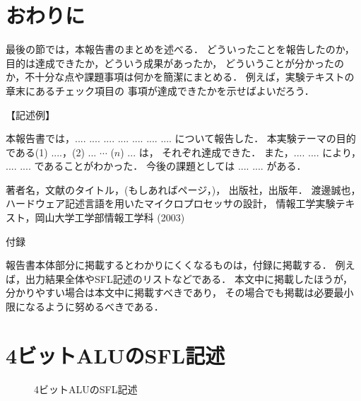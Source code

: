 \documentclass{jarticle}[11pt]
\begin{document}
\section{おわりに}
\label{sec:おわりに}
最後の節では，本報告書のまとめを述べる．
どういったことを報告したのか，目的は達成できたか，どういう成果があったか，
どういうことが分かったのか，不十分な点や課題事項は何かを簡潔にまとめる．
例えば，実験テキスト\cite{bib:実験テキスト}の章末にあるチェック項目の
事項が達成できたかを示せばよいだろう．

\noindent
【記述例】

本報告書では，.... .... .... .... .... .... .... について報告した．
本実験テーマの目的である(1) ....，(2) ... $\cdots$ ($n$) ... は，
それぞれ達成できた．
また，.... .... により， .... .... であることがわかった．
今後の課題としては .... .... がある．

\begin{thebibliography}{99}
 著者名，文献のタイトル，(もしあればページ，)，
出版社，出版年．
渡邊誠也，ハードウェア記述言語を用いたマイクロプロセッサの設計，
情報工学実験テキスト，岡山大学工学部情報工学科 (2003)
\end{thebibliography}


\newpage
\appendix

\noindent
{\Large \gt 付録}

報告書本体部分に掲載するとわかりにくくなるものは，付録に掲載する．
例えば，出力結果全体やSFL記述のリストなどである．
本文中に掲載したほうが，分かりやすい場合は本文中に掲載すべきであり，
その場合でも掲載は必要最小限になるように努めるべきである．

\section{4ビットALUのSFL記述}
\label{appsec:4ビットALUのSFL記述}

\begin{figure}[hbtp]
\begin{center}

\caption{4ビットALUのSFL記述}
\label{fig:4ビットALUのSFL記述}
\end{center}
\end{figure}
\end{document}
